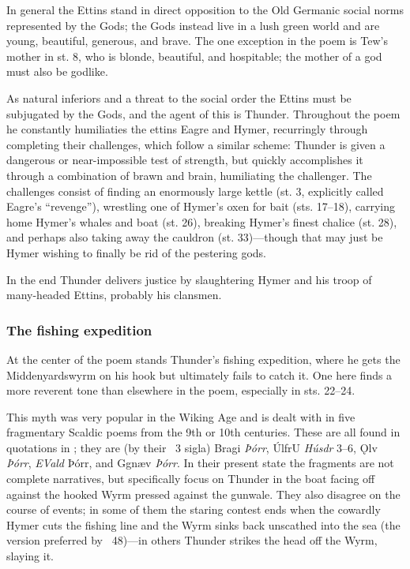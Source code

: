 In general the Ettins stand in direct opposition to the Old Germanic social norms represented by the Gods; the Gods instead live in a lush green world and are young, beautiful, generous, and brave.  The one exception in the poem is Tew’s mother in st. 8, who is blonde, beautiful, and hospitable; the mother of a god must also be godlike.

As natural inferiors and a threat to the social order the Ettins must be subjugated by the Gods, and the agent of this is Thunder.  Throughout the poem he constantly humiliaties the ettins Eagre and Hymer, recurringly through completing their challenges, which follow a similar scheme: Thunder is given a dangerous or near-impossible test of strength, but quickly accomplishes it through a combination of brawn and brain, humiliating the challenger.  The challenges consist of finding an enormously large kettle (st. 3, explicitly called Eagre’s “revenge”), wrestling one of Hymer’s oxen for bait (sts. 17–18), carrying home Hymer’s whales and boat (st. 26), breaking Hymer’s finest chalice (st. 28), and perhaps also taking away the cauldron (st. 33)—though that may just be Hymer wishing to finally be rid of the pestering gods.

In the end Thunder delivers justice by slaughtering Hymer and his troop of many-headed Ettins, probably his clansmen.

\subsubsection{The fishing expedition}

At the center of the poem stands Thunder’s fishing expedition, where he gets the Middenyardswyrm on his hook but ultimately fails to catch it.  One here finds a more reverent tone than elsewhere in the poem, especially in sts. 22–24.

This myth was very popular in the Wiking Age and is dealt with in five fragmentary Scaldic poems from the 9th or 10th centuries.  These are all found in quotations in \Skaldskaparmal; they are (by their \Skp\ 3 sigla) Bragi \emph{Þórr}, ÚlfrU \emph{Húsdr} 3–6, Ǫlv \emph{Þórr}, \emph{EVald} Þórr, and Ggnæv \emph{Þórr}.  In their present state the fragments are not complete narratives, but specifically focus on Thunder in the boat facing off against the hooked Wyrm pressed against the gunwale.  They also disagree on the course of events; in some of them the staring contest ends when the cowardly Hymer cuts the fishing line and the Wyrm sinks back unscathed into the sea (the version preferred by \Gylfaginning\ 48)—in others Thunder strikes the head off the Wyrm, slaying it.

